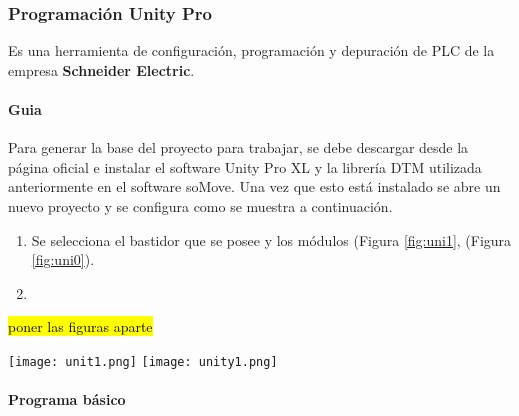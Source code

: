 \subsubsection{Programación Unity Pro}
\begin{tcolorbox}[colback=blue!5!white,colframe=blue!75!black,title=Definición]
	Es una herramienta de configuración, programación y depuración de PLC de la empresa \textbf{Schneider Electric}.
\end{tcolorbox}

\paragraph{Guia}
Para generar la base del proyecto para trabajar, se debe descargar desde la página oficial e instalar el software Unity Pro XL y la librería DTM utilizada anteriormente en el software soMove. Una vez que esto está instalado se abre un nuevo proyecto y se configura como se muestra a continuación.
\begin{enumerate}
	\item Se selecciona el bastidor que se posee y los módulos (Figura \ref{fig:uni1}, (Figura \ref{fig:uni0}).
	
	\item 
\end{enumerate}
\hl{poner las figuras aparte}
\begin{center}
	\texttt{[image: unit1.png]}
	\label{fig:uni1}
	\texttt{[image: unity1.png]}
	\label{fig:uni0}
\end{center}




\paragraph{Programa básico}
\newpage

